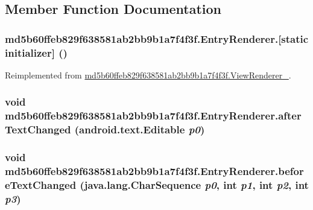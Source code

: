 \subsection{Member Function Documentation}
\hypertarget{classmd5b60ffeb829f638581ab2bb9b1a7f4f3f_1_1_entry_renderer_2ebca919e9e239ba2db4d8c41a15e6a4}{
\subsubsection[{[static initializer]}]{\setlength{\rightskip}{0pt plus 5cm}md5b60ffeb829f638581ab2bb9b1a7f4f3f.EntryRenderer.\mbox{[}static initializer\mbox{]} ()}}
\label{classmd5b60ffeb829f638581ab2bb9b1a7f4f3f_1_1_entry_renderer_2ebca919e9e239ba2db4d8c41a15e6a4}




Reimplemented from \hyperlink{classmd5b60ffeb829f638581ab2bb9b1a7f4f3f_1_1_view_renderer__2_a0898cf56fa9a49b653470eaf1608e77}{md5b60ffeb829f638581ab2bb9b1a7f4f3f.ViewRenderer\_}.\hypertarget{classmd5b60ffeb829f638581ab2bb9b1a7f4f3f_1_1_entry_renderer_bd753a7f1a81e9767e269259f1c38e25}{
\subsubsection[{afterTextChanged}]{\setlength{\rightskip}{0pt plus 5cm}void md5b60ffeb829f638581ab2bb9b1a7f4f3f.EntryRenderer.afterTextChanged (android.text.Editable {\em p0})}}
\label{classmd5b60ffeb829f638581ab2bb9b1a7f4f3f_1_1_entry_renderer_bd753a7f1a81e9767e269259f1c38e25}


\hypertarget{classmd5b60ffeb829f638581ab2bb9b1a7f4f3f_1_1_entry_renderer_17c929e5fb1379672df9b6b03f0b9cb4}{
\subsubsection[{beforeTextChanged}]{\setlength{\rightskip}{0pt plus 5cm}void md5b60ffeb829f638581ab2bb9b1a7f4f3f.EntryRenderer.beforeTextChanged (java.lang.CharSequence {\em p0}, \/  int {\em p1}, \/  int {\em p2}, \/  int {\em p3})}}
\label{classmd5b60ffeb829f638581ab2bb9b1a7f4f3f_1_1_entry_renderer_17c929e5fb1379672df9b6b03f0b9cb4}


